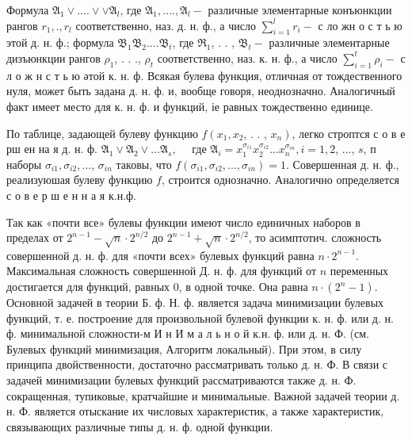 \documentclass[10pt]{article}
\begin{document}
Формула $\mathfrak{A}_{1} \vee \ldots . \vee \vee \mathfrak{A}_{l}$, где $\mathfrak{A}_{1}, \ldots ., \mathfrak{A}_{l}-$ различные элементарные конъюнкции рангов $r_{1}, ., r_{l}$ соответственно, наз. д. н. ф., а число $\sum_{i=1}^{l} r_{i}-$ с ло жн о с т ь ю этой д. н. ф.; формула $\mathfrak{B}_{1} \mathfrak{B}_{2} \ldots . \mathfrak{B}_{t}$, где $\mathfrak{R}_{1}$, . . , $\mathfrak{B}_{t}-$ различные элементарные дизъюнкции рангов $\rho_{1}$, . . ., $\rho_{t}$ соответственно, наз. к. н. ф., а число $\sum_{i=1}^{t} \rho_{i}-$ с л о ж н с т ь ю әтой к. н. ф. Всякая булева функция, отличная от тождественного нуля, может быть задана д. н. ф. и, вообще говоря, неоднозначно. Аналогичный факт имеет место для к. н. ф. и функций, іе равных тождественно единице.



По таблице, задающей булеву функцию $f\left(x_{1}, x_{2}\right.$, . . , $\left.x_{n}\right)$, легко строптся с о в е рш ен на я д. н. ф. $\mathfrak{A}_{1} \vee \mathfrak{A}_{2} \vee \ldots \mathfrak{A}_{s}, \quad$ где $\mathfrak{A}_{i}=x_{1}^{\sigma_{i 1}} x_{2}^{\sigma_{i 2}} \ldots x_{n}^{\sigma_{i n}}, i=1,2$, ..., $s$, п наборы $\sigma_{i 1}, \sigma_{i 2}, \ldots$, $\sigma_{i n}$ таковы, что $f\left(\sigma_{i 1}, \sigma_{i 2}, . . ., \sigma_{i n}\right)=1$. Совершенная д. н. ф., реализуюшая булеву функцию $f$, строится однозначно. Аналогично определяется с о в е р ш е н н а я к.н.ф.



Так как «почти все» булевы функции имеют число единичных наборов в пределах от $2^{n-1}-\sqrt{n} \cdot 2^{n / 2}$ до $2^{n-1}+\sqrt{n} \cdot 2^{n / 2}$, то асимптотич. сложность совершенной д. н. ф. для «почти всех» булевых функций равна $n \cdot 2^{n-1}$. Максимальная сложность совершенной Д. н. ф. для функций от $n$ переменных достигается для функций, равных 0, в одной точке. Она равна $n \cdot\left(2^{n}-1\right)$. Основной задачей в теории Б. ф. Н. ф. является задача минимизации булевых функций, т. е. построение для произвольной булевой функции к. н. ф. или д. н. ф. минимальной сложности-м И н И м а л ь н о й к.н. ф. или д. н. Ф. (см. Булевых функций минимизация, Алгоритм локальный). При этом, в силу принципа двойственности, достаточно рассматривать только д. н. Ф. В связи с задачей минимизации булевых функций рассматриваются также д. н. Ф. сокращенная, тупиковые, кратчайшие и минимальные. Важной задачей теории д. н. Ф. является отыскание их числовых характеристик, а также характеристик, связывающих различные типы д. н. ф. одной функции.
\end{document}
